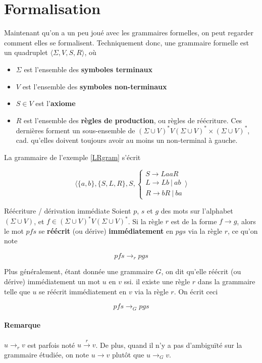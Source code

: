  \section{Formalisation}
 
 Maintenant qu'on a un peu joué avec les grammaires formelles, on peut regarder comment elles se formalisent. Techniquement donc, une grammaire formelle est un quadruplet $\big \langle\Sigma, V, S, R \big \rangle$, où
 
 \begin{itemize}
 \item $\Sigma$ est l'ensemble des \textbf{symboles terminaux}
 \item $V$ est l'ensemble des \textbf{symboles non-terminaux}
 \item $S \in V$ est l'\textbf{axiome}
 \item $R$ est l'ensemble des \textbf{règles de production}, ou règles de réécriture. Ces dernières forment un sous-ensemble de $(\Sigma \cup V)^*V(\Sigma \cup V)^* \times (\Sigma \cup V)^*$, cad. qu'elles doivent toujours avoir au moins un non-terminal à gauche. 
 \end{itemize}
 
 
 
\begin{example}
La grammaire de l'exemple \ref{LRgram} s'écrit 

\[
\big \langle \{a,b\},\{S,L,R\},S, \begin{cases}
S \rightarrow LaaR \\
L \rightarrow Lb~|~ab \\
R \rightarrow bR~|~ba
\end{cases}
 \big \rangle
\]


\begin{definition}{Réécriture / dérivation immédiate}{}
Soient $p$, $s$ et $g$ des mots sur l'alphabet $(\Sigma \cup V)$, et $f \in (\Sigma \cup V)^*V(\Sigma \cup V)^*$. Si la règle $r$ est de la forme $f \rightarrow g$, alors le mot $pfs$ se \textbf{réécrit} (ou dérive) \textbf{immédiatement} en $pgs$ via la règle $r$, ce qu'on note 

\[
pfs \rightarrow_r pgs
\]

Plus généralement, étant donnée une grammaire $G$, on dit qu'elle réécrit (ou dérive) immédiatement un mot $u$ en $v$ ssi. il existe une règle $r$ dans la grammaire telle que $u$ se réécrit immédiatement en $v$ via la règle $r$. On écrit ceci 

\[
pfs \rightarrow_G pgs
\]
\end{definition}

\paragraph{Remarque} $u \rightarrow_r v$ est parfois noté $u \xrightarrow{r} v$. De plus, quand il n'y a pas d'ambiguïté sur la grammaire étudiée, on note $u \rightarrow v$ plutôt que $u \rightarrow_G v$.


\end{example}


